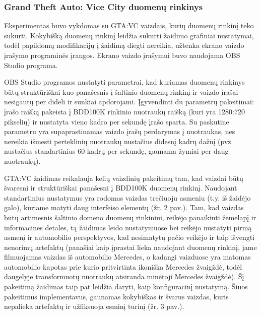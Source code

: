 \documentclass{VUMIFPSkursinis}
\begin{document}
        \subsubsection{Grand Theft Auto: Vice City duomenų rinkinys}
            Eksperimentas buvo vykdomas su GTA:VC vaizdais, kurių duomenų rinkinį teko sukurti. Kokybišką duomenų rinkinį leidžia sukurti žaidimo grafiniai nustatymai, todėl papildomų modifikacijų į žaidimą diegti nereikia, užtenka ekrano vaizdo įrašymo programinės įrangos. Ekrano vaizdo įrašymui buvo naudojama OBS Studio programa.
            
            OBS Studio programos nustatyti parametrai, kad kuriamas duomenų rinkinys būtų struktūriškai kuo panašesnis į šaltinio duomenų rinkinį ir vaizdo įrašai nesigautų per dideli ir sunkiai apdorojami. Įgyvendinti du parametrų pakeitimai: įrašo raišką pakeista į BDD100K rinkinio nuotraukų raišką (kuri yra 1280:720 pikselių) ir nustatyta vieno kadro per sekundę įrašo sparta. Su paskutine parametru yra supaprastinamas vaizdo įrašų perdarymas į nuotraukas, nes nereikia išmesti perteklinių nuotraukų nustačius didesnį kadrų dažnį (pvz. nustačius standartinius 60 kadrų per sekundę, gaunama žymiai per daug nuotraukų).
            
            GTA:VC žaidimas reikalauja kelių vaizdinių pakeitimų tam, kad vaizdai būtų švaresni ir struktūriškai panašesni į BDD100K duomenų rinkinį. Naudojant standartinius nustatymus yra rodomas vaizdas trečiuoju asmeniu (t.y. iš žaidėjo galo), kuriame matyti daug interfeiso elementų (žr. 2 pav.). Tam, kad vaizdas būtų artimesnis šaltinio domeno duomenų rinkiniui, reikėjo panaikinti žemėlapį ir informacines detales, tą žaidimas leido nustatymuose bei reikėjo nustatyti pirmą asmenį ir automobilio perspektyvos, kad nesimatytų pačio veikėjo ir taip išvengti nenorimų artefaktų (panašiai kaip įprastai lieka naudojant \cite{DaimCityDaSe} duomenų rinkinį, jame filmuojamas vaizdas iš automobilio Mercedes, o kadangi vaizduose yra matomas automobilio kapotas prie kurio pritvirtinta ikoniška Mercedes žvaigždė, todėl daugelyje transformuotų nuotraukų atsiranda minėtoji Mercedes žvaigždė). Šį pakeitimą žaidimas taip pat leidžia daryti, kaip konfiguracinį nustatymą. Šiuos pakeitimus implementavus, gaunamas kokybiškas ir švarus vaizdas, kuris nepalieka artefaktų ir užfiksuoja esminį turinį (žr. 3 pav.).
\end{document}
